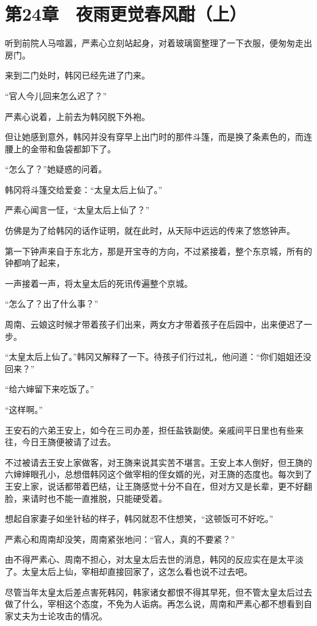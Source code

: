 \section{第24章　夜雨更觉春风酣（上）}

听到前院人马喧嚣，严素心立刻站起身，对着玻璃窗整理了一下衣服，便匆匆走出房门。

来到二门处时，韩冈已经先进了门来。

“官人今儿回来怎么迟了？”

严素心说着，上前去为韩冈脱下外袍。

但让她感到意外，韩冈并没有穿早上出门时的那件斗篷，而是换了条素色的，而连腰上的金带和鱼袋都卸下了。

“怎么了？”她疑惑的问着。

韩冈将斗篷交给爱妾：“太皇太后上仙了。”

严素心闻言一怔，“太皇太后上仙了？”

仿佛是为了给韩冈的话作证明，就在此时，从天际中远远的传来了悠悠钟声。

第一下钟声来自于东北方，那是开宝寺的方向，不过紧接着，整个东京城，所有的钟都响了起来，

一声接着一声，将太皇太后的死讯传遍整个京城。

“怎么了？出了什么事？”

周南、云娘这时候才带着孩子们出来，两女方才带着孩子在后园中，出来便迟了一步。

“太皇太后上仙了。”韩冈又解释了一下。待孩子们行过礼，他问道：“你们姐姐还没回来？”

“给六婶留下来吃饭了。”

“这样啊。”

王安石的六弟王安上，如今在三司办差，担任盐铁副使。亲戚间平日里也有些来往，今日王旖便被请了过去。

不过被请去王安上家做客，对王旖来说其实苦不堪言。王安上本人倒好，但王旖的六婶婶眼孔小，总想借韩冈这个做宰相的侄女婿的光，对王旖的态度也。每次到了王安上家，说话都带着巴结，让王旖感觉十分不自在，但对方又是长辈，更不好翻脸，来请时也不能一直推脱，只能硬受着。

想起自家妻子如坐针毡的样子，韩冈就忍不住想笑，“这顿饭可不好吃。”

严素心和周南却没笑，周南紧张地问：“官人，真的不要紧？”

由不得严素心、周南不担心，对太皇太后去世的消息，韩冈的反应实在是太平淡了。太皇太后上仙，宰相却直接回家了，这怎么看也说不过去吧。

尽管当年太皇太后差点害死韩冈，韩家诸女都恨不得其早死，但不管太皇太后过去做了什么，宰相这个态度，不免为人诟病。再怎么说，周南和严素心都不想看到自家丈夫为士论攻击的情况。

